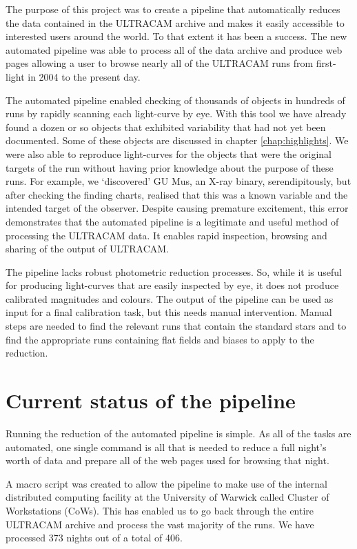 The purpose of this project was to create a pipeline that automatically reduces the data contained in the ULTRACAM archive and makes it easily accessible to interested users around the world. To that extent it has been a success. The new  automated pipeline was able to process all of the data archive and produce web pages allowing a user to browse nearly all of the ULTRACAM runs from first-light in 2004 to the present day. 

The automated pipeline enabled checking of thousands of objects in hundreds of runs by rapidly scanning each light-curve by eye. With this tool we have already found a dozen or so objects that exhibited variability that had not yet been documented. Some of these objects are discussed in chapter \ref{chap:highlights}. We were also able to reproduce light-curves for the objects that were the original targets of the run without having prior knowledge about the purpose of these runs. For example, we `discovered' {GU Mus}, an X-ray binary, serendipitously, but after checking the finding charts, realised that this was a known variable and the intended target of the observer. Despite causing premature excitement, this error demonstrates that the automated pipeline is a legitimate and useful method of processing the ULTRACAM data. It enables rapid inspection, browsing and sharing of the output of ULTRACAM. 

The pipeline lacks robust photometric reduction processes. So, while it is useful for producing light-curves that are easily inspected by eye, it does not produce calibrated magnitudes and colours. The output of the pipeline can be used as input for a final calibration task, but this needs manual intervention. Manual steps are needed to find the relevant runs that contain the standard stars and to find the appropriate runs containing flat fields and biases to apply to the reduction. 

\section{Current status of the pipeline}
Running the reduction of the automated pipeline is simple. As all of the tasks are automated, one single command is all that is needed to reduce a full night's worth of data and prepare all of the web pages used for browsing that night. 

A macro script was created to allow the pipeline to make use of the internal distributed computing facility at the University of Warwick called Cluster of Workstations (CoWs). This has enabled us to go back through the entire ULTRACAM archive and process the vast majority of the runs. We have processed 373 nights out of a total of 406. 

